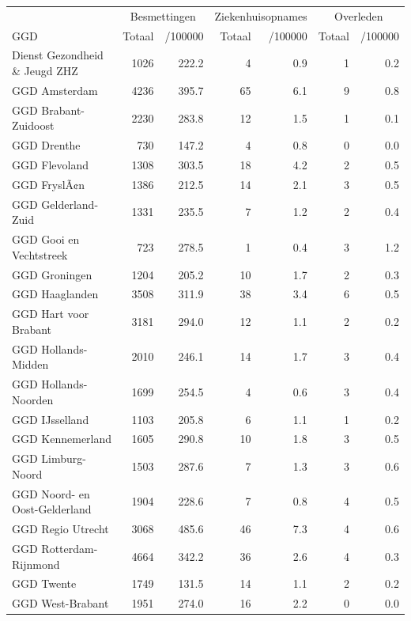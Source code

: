 \documentclass[
  english,
  man,floatsintext]{apa6}
\begin{document}
\begin{table}
\centering\begingroup\fontsize{10}{12}\selectfont

\begin{threeparttable}
\begin{tabular}{lrrrrrr}
\toprule
\multicolumn{1}{c}{ } & \multicolumn{2}{c}{Besmettingen} & \multicolumn{2}{c}{Ziekenhuisopnames} & \multicolumn{2}{c}{Overleden} \\
\cmidrule(l{3pt}r{3pt}){2-3} \cmidrule(l{3pt}r{3pt}){4-5} \cmidrule(l{3pt}r{3pt}){6-7}
GGD & Totaal & /100000 & Totaal & /100000 & Totaal & /100000\\
\midrule
Dienst Gezondheid \& Jeugd ZHZ & 1026 & 222.2 & 4 & 0.9 & 1 & 0.2\\
GGD Amsterdam & 4236 & 395.7 & 65 & 6.1 & 9 & 0.8\\
GGD Brabant-Zuidoost & 2230 & 283.8 & 12 & 1.5 & 1 & 0.1\\
GGD Drenthe & 730 & 147.2 & 4 & 0.8 & 0 & 0.0\\
GGD Flevoland & 1308 & 303.5 & 18 & 4.2 & 2 & 0.5\\
GGD FryslÃ¢n & 1386 & 212.5 & 14 & 2.1 & 3 & 0.5\\
GGD Gelderland-Zuid & 1331 & 235.5 & 7 & 1.2 & 2 & 0.4\\
GGD Gooi en Vechtstreek & 723 & 278.5 & 1 & 0.4 & 3 & 1.2\\
GGD Groningen & 1204 & 205.2 & 10 & 1.7 & 2 & 0.3\\
GGD Haaglanden & 3508 & 311.9 & 38 & 3.4 & 6 & 0.5\\
GGD Hart voor Brabant & 3181 & 294.0 & 12 & 1.1 & 2 & 0.2\\
GGD Hollands-Midden & 2010 & 246.1 & 14 & 1.7 & 3 & 0.4\\
GGD Hollands-Noorden & 1699 & 254.5 & 4 & 0.6 & 3 & 0.4\\
GGD IJsselland & 1103 & 205.8 & 6 & 1.1 & 1 & 0.2\\
GGD Kennemerland & 1605 & 290.8 & 10 & 1.8 & 3 & 0.5\\
GGD Limburg-Noord & 1503 & 287.6 & 7 & 1.3 & 3 & 0.6\\
GGD Noord- en Oost-Gelderland & 1904 & 228.6 & 7 & 0.8 & 4 & 0.5\\
GGD Regio Utrecht & 3068 & 485.6 & 46 & 7.3 & 4 & 0.6\\
GGD Rotterdam-Rijnmond & 4664 & 342.2 & 36 & 2.6 & 4 & 0.3\\
GGD Twente & 1749 & 131.5 & 14 & 1.1 & 2 & 0.2\\
GGD West-Brabant & 1951 & 274.0 & 16 & 2.2 & 0 & 0.0\\

\end{tabular}
\end{threeparttable}
\end{table}
\end{document}
